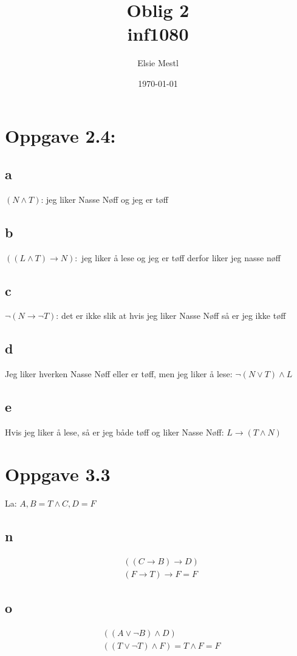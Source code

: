 \documentclass[a4paper, norsk, 10pt]{article}
\date{\today}
\title{Oblig 2 \\ inf1080}
\author{Elsie Mestl}
\begin{document}
\maketitle
\begin{flushleft}
\section*{Oppgave 2.4:}

\subsection*{a}
 $(N \wedge T)$: \quad jeg liker Nasse Nøff og jeg er tøff

\subsection*{b}
$((L \wedge T) \rightarrow N):$ \quad  jeg liker å lese og jeg er tøff derfor liker jeg nasse nøff

\subsection*{c}
$\neg(N \rightarrow \neg T)$: \quad det er ikke slik at hvis jeg liker Nasse Nøff så er jeg ikke tøff

\subsection*{d}
Jeg liker hverken Nasse Nøff eller er tøff, men jeg liker å lese: \quad $\neg (N \vee T) \wedge L$ %

\subsection*{e}
Hvis jeg liker å lese, så er jeg både tøff og liker Nasse Nøff: \quad $L \rightarrow (T \wedge N)$


\section*{Oppgave 3.3}
La: \quad $A,B = T \wedge C,D = F $
\subsection*{n}
\begin{align*}
&((C \rightarrow B) \rightarrow D) \\
&(F \rightarrow T) \rightarrow F = F
\end{align*}


\subsection*{o}
\begin{align*}
&((A \vee \neg B) \wedge D)\\
&((T \vee \neg T) \wedge F) = T \wedge F = F
\end{align*}  
\end{flushleft}
\end{document}
